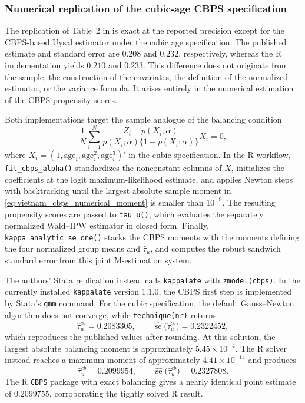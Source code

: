 
\subsubsection{Numerical replication of the cubic-age CBPS specification}
\label{subsubsec:vietnam_cbps_replication}

The replication of Table~2 in \citet{sloczynski2025abadie} is exact at the
reported precision except for the CBPS-based Uysal estimator under the cubic
age specification. The published estimate and standard error are
\(0.208\) and \(0.232\), respectively, whereas the R implementation yields
\(0.210\) and \(0.233\). This difference does not originate from the sample,
the construction of the covariates, the definition of the normalized
estimator, or the variance formula. It arises entirely in the numerical
estimation of the CBPS propensity scores.

Both implementations target the sample analogue of the balancing condition
\begin{equation}
    \frac{1}{N}\sum_{i=1}^{N}
    \frac{Z_i-p(X_i;\alpha)}
         {p(X_i;\alpha)\{1-p(X_i;\alpha)\}}X_i=0,
    \label{eq:vietnam_cbps_numerical_moment}
\end{equation}
where \(X_i=(1,\text{age}_i,\text{age}_i^2,\text{age}_i^3)'\) in the cubic
specification. In the R workflow, \texttt{fit\_cbps\_alpha()} standardizes the
nonconstant columns of \(X\), initializes the coefficients at the logit
maximum-likelihood estimate, and applies Newton steps with backtracking until
the largest absolute sample moment in
\eqref{eq:vietnam_cbps_numerical_moment} is smaller than \(10^{-9}\). The
resulting propensity scores are passed to \texttt{tau\_u()}, which evaluates
the separately normalized Wald--IPW estimator in closed form. Finally,
\texttt{kappa\_analytic\_se\_one()} stacks the CBPS moments with the moments
defining the four normalized group means and \(\widehat\tau_u\), and computes
the robust sandwich standard error from this joint M-estimation system.

The authors' Stata replication instead calls \texttt{kappalate} with
\texttt{zmodel(cbps)}. In the currently installed \texttt{kappalate} version
1.1.0, the CBPS first step is implemented by Stata's \texttt{gmm} command.
For the cubic specification, the default Gauss--Newton algorithm does not
converge, while \texttt{technique(nr)} returns
\[
    \widehat\tau_u^{cb}=0.2083305,
    \qquad
    \widehat{\operatorname{se}}
    \bigl(\widehat\tau_u^{cb}\bigr)=0.2322452,
\]
which reproduces the published values after rounding. At this solution, the
largest absolute balancing moment is approximately \(5.45\times10^{-4}\).
The R solver instead reaches a maximum moment of approximately
\(4.41\times10^{-14}\) and produces
\[
    \widehat\tau_u^{cb}=0.2099954,
    \qquad
    \widehat{\operatorname{se}}
    \bigl(\widehat\tau_u^{cb}\bigr)=0.2327808.
\]
The R \texttt{CBPS} package with exact balancing gives a nearly
identical point estimate of \(0.2099755\), corroborating the tightly solved R
result.

